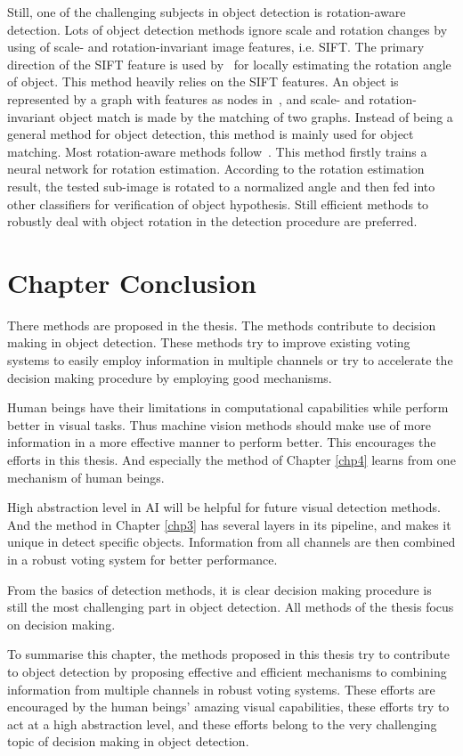 Still, one of the challenging subjects in object detection is rotation-aware detection. Lots of object detection methods ignore scale and rotation changes by using of scale- and rotation-invariant image features, i.e. SIFT.
The primary  direction of the SIFT feature is used by~\citep{ac21} for locally estimating the rotation angle of object. This method heavily relies on the SIFT features.
An object is represented by a graph with features as nodes in~\citep{ac222}, and scale- and rotation-invariant object match is made by the matching of two graphs. Instead of being a general method for object detection, this method is mainly used for object matching.
Most rotation-aware methods follow~\citep{ac20}. This method firstly trains a neural network for rotation estimation. According to the rotation estimation result, the tested sub-image is rotated to a normalized angle and then fed into other classifiers for verification of object hypothesis. Still efficient methods to robustly deal with object rotation in the detection procedure are preferred.




\begin{comment}
(a) a well-de?ned closed boundary
in space; (b) a different appearance from their surroundings [23, 25]; (c) sometimes it is unique within the image
and stands out as salient
\end{comment}
\section{Chapter Conclusion}
\label{ch2p5}
There methods are proposed in the thesis. The methods contribute to decision making in object detection. These methods try to improve existing voting systems to easily employ information in multiple channels or try to accelerate the decision making procedure by employing good mechanisms.

Human beings have their limitations in computational capabilities while perform better in visual tasks. Thus machine vision methods should make use of more information in a more effective manner to perform better. This encourages the efforts in this thesis. And especially the method of Chapter \ref{chp4} learns from one mechanism of human beings.

High abstraction level in AI will be helpful for future visual detection methods. And the method in Chapter \ref{chp3} has several layers in its pipeline, and makes it unique in detect specific objects. Information from all channels are then combined in a robust voting system for better performance.

From the basics of detection methods, it is clear decision making procedure is still the most challenging part in object detection. All methods of the thesis focus on decision making.

To summarise this chapter, the methods proposed in this thesis try to contribute to object detection by proposing effective and efficient mechanisms to combining information from multiple channels in robust voting systems. These efforts are encouraged by the human beings' amazing visual capabilities, these efforts try to act at a high abstraction level, and these efforts belong to the very challenging topic of decision making in object detection.
